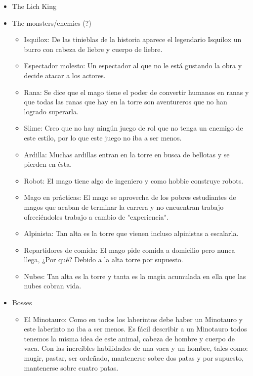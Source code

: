 \begin{itemize}
    \item The Lich King %
    \item The monsters/enemies (?)
    \begin{itemize}
        \item Isquilox: De las tinieblas de la historia aparece el legendario Isquilox un burro con cabeza de liebre y cuerpo de liebre.
        \item Espectador molesto: Un espectador al que no le está gustando la obra y decide atacar a los actores.
        \item Rana: Se dice que el mago tiene el poder de convertir humanos en ranas y que todas las ranas que hay en la torre son aventureros que no han logrado superarla.
        \item Slime: Creo que no hay ningún juego de rol que no tenga un enemigo de este estilo, por lo que este juego no iba a ser menos.
        \item Ardilla: Muchas ardillas entran en la torre en busca de bellotas y se pierden en ésta.
        \item Robot: El mago tiene algo de ingeniero y como hobbie construye robots.
        \item Mago en prácticas: El mago se aprovecha de los pobres estudiantes de magos que acaban de terminar la carrera y no encuentran trabajo ofreciéndoles trabajo a cambio de "experiencia".
        \item Alpinista: Tan alta es la torre que vienen incluso alpinistas a escalarla.
        \item Repartidores de comida: El mago pide comida a domicilio pero nunca llega, ¿Por qué? Debido a la alta torre por supuesto.
        \item  Nubes: Tan alta es la torre y tanta es la magia acumulada en ella que las nubes cobran vida.
    \end{itemize}
    \item Bosses
    \begin{itemize}
        \item El Minotauro: Como en todos los laberintos debe haber un Minotauro y este laberinto no iba a ser menos. Es fácil describir a un Minotauro todos tenemos la misma idea de este animal, cabeza de hombre y cuerpo de vaca. Con las increíbles habilidades de una vaca y un hombre, tales como: mugir, pastar, ser ordeñado, mantenerse sobre dos patas y por supuesto, mantenerse sobre cuatro patas.
        

\end{itemize}
\end{itemize}
